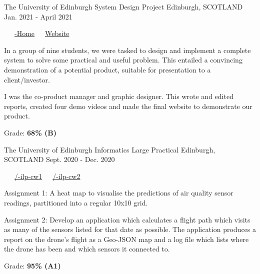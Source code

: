 \begin{cventries}
  \cventry
    {The University of Edinburgh} %
    {System Design Project} %
    {Edinburgh, SCOTLAND} %
    {Jan. 2021 - April 2021} %
    {
      \color{awesome}     \color{graytext}\ \ \ \href{https://github.com/DeliverED-Home}{\faGithub\acvHeaderIconSep\@DeliverED-Home}\ \ \ \href{https://DeliverED-Home.github.io/DeliverED-Site}{\faGlobe\acvHeaderIconSep\@Product Website}
      \vspace{1.8em}
      \begin{cvitems} %
        \item In a group of nine students, we were tasked to design and implement a complete system to solve some practical and useful problem. This entailed a convincing demonstration of a potential product, suitable for presentation to a client/investor.
        \item I was the co-product manager and graphic designer. This wrote and edited reports, created four demo videos and made the final website to demonstrate our product.
        \item Grade: \textbf{68\% (B)}
      \end{cvitems}
    }
    \vspace{.08cm}

  \cventry
    {The University of Edinburgh} %
    {Informatics Large Practical} %
    {Edinburgh, SCOTLAND} %
    {Sept. 2020 - Dec. 2020} %
    {
      \color{awesome} \color{graytext}\ \ \ \href{https://github.com/chrisjpm/inf3-ilp-cw1}{\faGithub\acvHeaderIconSep\@chrisjpm/-ilp-cw1}\ \ \ \href{https://github.com/chrisjpm/inf3-ilp-cw2}{\faGithub\acvHeaderIconSep\@chrisjpm/-ilp-cw2}
      \vspace{1.8em}
      \begin{cvitems} %
        \item Assignment 1: A heat map to visualise the predictions of air quality sensor readings, partitioned into a regular 10x10 grid.
        \item Assignment 2: Develop an application which calculates a flight path which visits as many of the sensors listed for that date as possible. The application produces a report on the drone’s flight as a Geo-JSON map and a log file which lists where the drone has been and which sensors it connected to.
        \item Grade: \textbf{95\% (A1)}
      \end{cvitems}
    }
    \vspace{.08cm}
\end{cventries}
